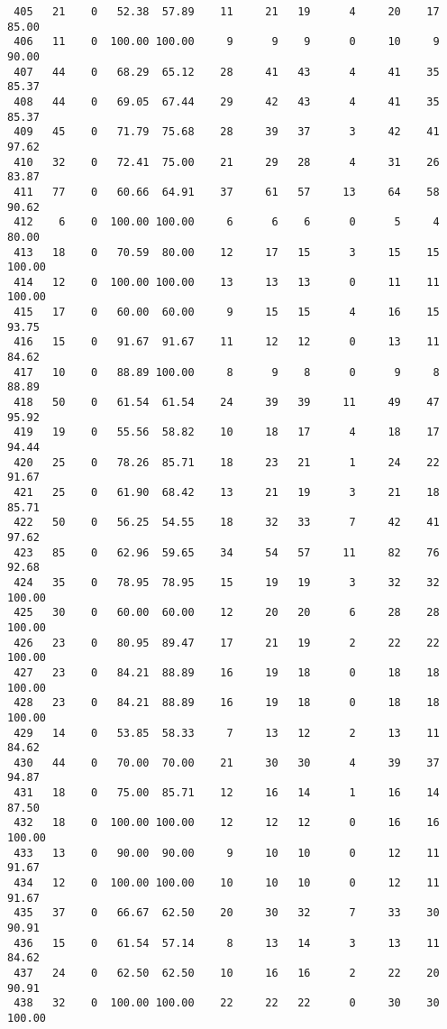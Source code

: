 \begin{verbatim}
 405   21    0   52.38  57.89    11     21   19      4     20    17    85.00
 406   11    0  100.00 100.00     9      9    9      0     10     9    90.00
 407   44    0   68.29  65.12    28     41   43      4     41    35    85.37
 408   44    0   69.05  67.44    29     42   43      4     41    35    85.37
 409   45    0   71.79  75.68    28     39   37      3     42    41    97.62
 410   32    0   72.41  75.00    21     29   28      4     31    26    83.87
 411   77    0   60.66  64.91    37     61   57     13     64    58    90.62
 412    6    0  100.00 100.00     6      6    6      0      5     4    80.00
 413   18    0   70.59  80.00    12     17   15      3     15    15   100.00
 414   12    0  100.00 100.00    13     13   13      0     11    11   100.00
 415   17    0   60.00  60.00     9     15   15      4     16    15    93.75
 416   15    0   91.67  91.67    11     12   12      0     13    11    84.62
 417   10    0   88.89 100.00     8      9    8      0      9     8    88.89
 418   50    0   61.54  61.54    24     39   39     11     49    47    95.92
 419   19    0   55.56  58.82    10     18   17      4     18    17    94.44
 420   25    0   78.26  85.71    18     23   21      1     24    22    91.67
 421   25    0   61.90  68.42    13     21   19      3     21    18    85.71
 422   50    0   56.25  54.55    18     32   33      7     42    41    97.62
 423   85    0   62.96  59.65    34     54   57     11     82    76    92.68
 424   35    0   78.95  78.95    15     19   19      3     32    32   100.00
 425   30    0   60.00  60.00    12     20   20      6     28    28   100.00
 426   23    0   80.95  89.47    17     21   19      2     22    22   100.00
 427   23    0   84.21  88.89    16     19   18      0     18    18   100.00
 428   23    0   84.21  88.89    16     19   18      0     18    18   100.00
 429   14    0   53.85  58.33     7     13   12      2     13    11    84.62
 430   44    0   70.00  70.00    21     30   30      4     39    37    94.87
 431   18    0   75.00  85.71    12     16   14      1     16    14    87.50
 432   18    0  100.00 100.00    12     12   12      0     16    16   100.00
 433   13    0   90.00  90.00     9     10   10      0     12    11    91.67
 434   12    0  100.00 100.00    10     10   10      0     12    11    91.67
 435   37    0   66.67  62.50    20     30   32      7     33    30    90.91
 436   15    0   61.54  57.14     8     13   14      3     13    11    84.62
 437   24    0   62.50  62.50    10     16   16      2     22    20    90.91
 438   32    0  100.00 100.00    22     22   22      0     30    30   100.00

\end{verbatim}
